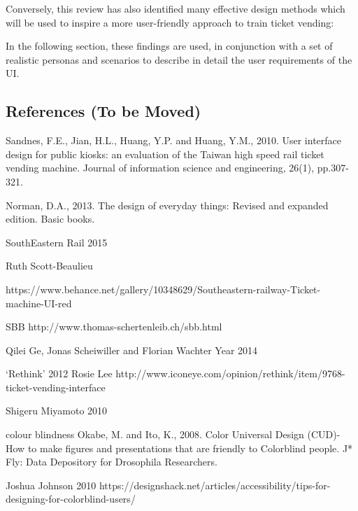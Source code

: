 Conversely, this review has also identified many effective design methods which will be used to inspire a more user-friendly approach to train ticket vending:

In the following section, these findings are used, in conjunction with a set of realistic personas and scenarios to describe in detail the user requirements of the UI.

\subsection{References (To be Moved)}
Sandnes, F.E., Jian, H.L., Huang, Y.P. and Huang, Y.M., 2010. User interface design for public kiosks: an evaluation of the Taiwan high speed rail ticket vending machine. Journal of information science and engineering, 26(1), pp.307-321. 

Norman, D.A., 2013. The design of everyday things: Revised and expanded edition. Basic books.


SouthEastern Rail 2015

Ruth Scott-Beaulieu

https://www.behance.net/gallery/10348629/Southeastern-railway-Ticket-machine-UI-red


SBB
http://www.thomas-schertenleib.ch/sbb.html

Qilei Ge, Jonas Scheiwiller and Florian Wachter
Year
2014


‘Rethink’ 2012 Rosie Lee
http://www.iconeye.com/opinion/rethink/item/9768-ticket-vending-interface 


Shigeru Miyamoto 2010


colour blindness
Okabe, M. and Ito, K., 2008. Color Universal Design (CUD)-How to make figures and presentations that are friendly to Colorblind people. J* Fly: Data Depository for Drosophila Researchers.


Joshua Johnson 2010
https://designshack.net/articles/accessibility/tips-for-designing-for-colorblind-users/
